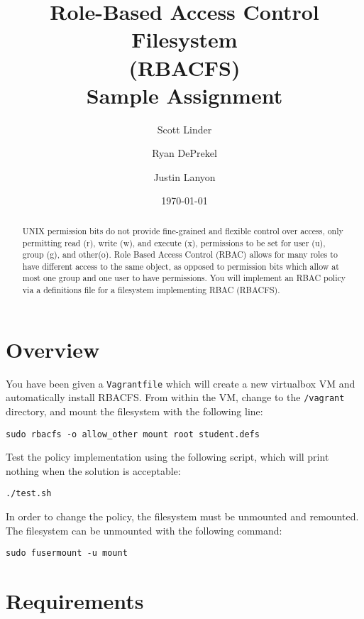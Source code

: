 \documentclass[11pt,oneside,letterpaper]{article}
\begin{document}
\title{
    Role-Based Access Control Filesystem\\
    (RBACFS) \\
    Sample Assignment
}
\author{
    Scott Linder\\
    \and
    Ryan DePrekel\\
    \and
    Justin Lanyon
}
\date{\today}

\maketitle

\begin{abstract}
UNIX permission bits do not provide fine-grained and flexible control over
access, only permitting read (r), write (w), and execute (x), permissions to be
set for user (u), group (g), and other(o). Role Based Access Control (RBAC)
allows for many roles to have different access to the same object, as opposed
to permission bits which allow at most one group and one user to have
permissions. You will implement an RBAC policy via a definitions file for
a filesystem implementing RBAC (RBACFS).
\end{abstract}

\section{Overview}

You have been given a {\tt Vagrantfile} which will create a new virtualbox
VM and automatically install RBACFS. From within the VM, change to the
{\tt /vagrant} directory, and mount the filesystem with the following line:
\begin{lstlisting}
sudo rbacfs -o allow_other mount root student.defs
\end{lstlisting}

Test the policy implementation using the following script, which will
print nothing when the solution is acceptable:
\begin{lstlisting}
./test.sh
\end{lstlisting}

In order to change the policy, the filesystem must be unmounted and remounted.
The filesystem can be unmounted with the following command:
\begin{lstlisting}
sudo fusermount -u mount
\end{lstlisting}

\section{Requirements}
\end{document}
